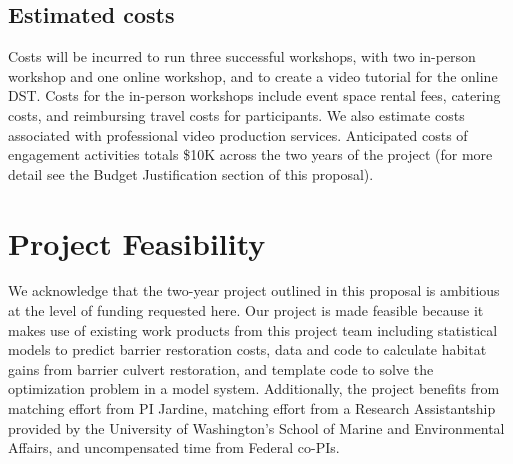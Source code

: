 \documentclass[12pt]{elsarticle}
\begin{document}
\subsection*{Estimated costs}

Costs will be incurred to run three successful workshops, with two in-person workshop and one online workshop, and to create a video tutorial for the online DST.  Costs for the in-person workshops include event space rental fees, catering costs, and reimbursing travel costs for participants. We also estimate costs associated with professional video production services. Anticipated costs of engagement activities totals \$10K across the two years of the project (for more detail see the Budget Justification section of this proposal).

\section*{Project Feasibility}

We acknowledge that the two-year project outlined in this proposal is ambitious at the level of funding requested here. Our project is made feasible because it makes use of existing work products from this project team including statistical models to predict barrier restoration costs, data and code to calculate habitat gains from barrier culvert restoration, and template code to solve the optimization problem in a model system. Additionally, the project benefits from matching effort from PI Jardine, matching effort from a Research Assistantship provided by the University of Washington's School of Marine and Environmental Affairs, and uncompensated time from Federal co-PIs.

\clearpage
\normalsize

\end{document}
